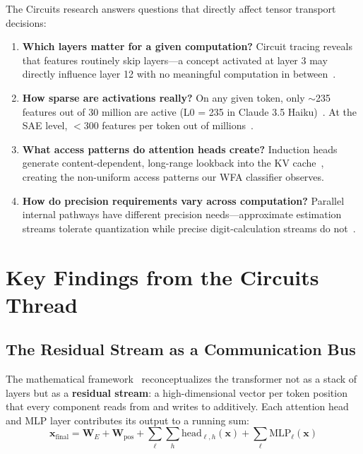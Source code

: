 \documentclass[11pt,letterpaper]{article}
\begin{document}
The Circuits research answers questions that directly affect tensor transport decisions:

\begin{enumerate}
    \item \textbf{Which layers matter for a given computation?} Circuit tracing reveals that features routinely skip layers---a concept activated at layer 3 may directly influence layer 12 with no meaningful computation in between~\cite{ameisen2025tracing}.
    \item \textbf{How sparse are activations really?} On any given token, only $\sim$235 features out of 30 million are active (L0 = 235 in Claude 3.5 Haiku)~\cite{lindsey2025biology}. At the SAE level, $<$300 features per token out of millions~\cite{templeton2024scaling}.
    \item \textbf{What access patterns do attention heads create?} Induction heads generate content-dependent, long-range lookback into the KV cache~\cite{olsson2022induction}, creating the non-uniform access patterns our WFA classifier observes.
    \item \textbf{How do precision requirements vary across computation?} Parallel internal pathways have different precision needs---approximate estimation streams tolerate quantization while precise digit-calculation streams do not~\cite{lindsey2025biology}.
\end{enumerate}

\section{Key Findings from the Circuits Thread}
\label{sec:findings}

\subsection{The Residual Stream as a Communication Bus}

The mathematical framework~\cite{elhage2021framework} reconceptualizes the transformer not as a stack of layers but as a \textbf{residual stream}: a high-dimensional vector per token position that every component reads from and writes to additively. Each attention head and MLP layer contributes its output to a running sum:
\begin{equation}
    \mathbf{x}_{\text{final}} = \mathbf{W}_E + \mathbf{W}_{\text{pos}} + \sum_{\ell} \sum_h \text{head}_{\ell,h}(\mathbf{x}) + \sum_{\ell} \text{MLP}_\ell(\mathbf{x})
\end{equation}
\end{document}
